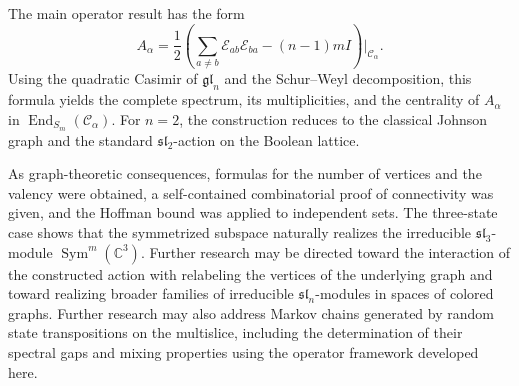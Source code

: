 \documentclass[12pt,reqno]{amsart}
\newcommand{\End}{\operatorname{End}}
\newcommand{\Sym}{\operatorname{Sym}}
\begin{document}
The main operator result has the form
$$
A_\alpha
=
\frac12
\left(
\sum_{a\ne b}\mathcal E_{ab}\mathcal E_{ba}
-(n-1)mI
\right)\Bigg|_{\mathcal C_\alpha}.
$$
Using the quadratic Casimir of $\mathfrak{gl}_n$ and the Schur--Weyl
decomposition, this formula yields the complete spectrum, its
multiplicities, and the centrality of $A_\alpha$ in
$\End_{S_m}(\mathcal C_\alpha)$. For $n=2$, the construction reduces to
the classical Johnson graph and the standard $\mathfrak{sl}_2$-action on
the Boolean lattice.

As graph-theoretic consequences, formulas for the number of vertices and
the valency were obtained, a self-contained combinatorial proof of
connectivity was given, and the Hoffman bound was applied to independent
sets. The three-state case shows that the symmetrized subspace naturally
realizes the irreducible $\mathfrak{sl}_3$-module
$\Sym^m(\mathbb C^3)$. Further research may be directed toward the
interaction of the constructed action with relabeling the vertices of the
underlying graph and toward realizing broader families of irreducible
$\mathfrak{sl}_n$-modules in spaces of colored graphs.  
Further research may also address Markov chains generated by random
state transpositions on the multislice, including the determination of
their spectral gaps and mixing properties using the operator framework
developed here.
\end{document}
